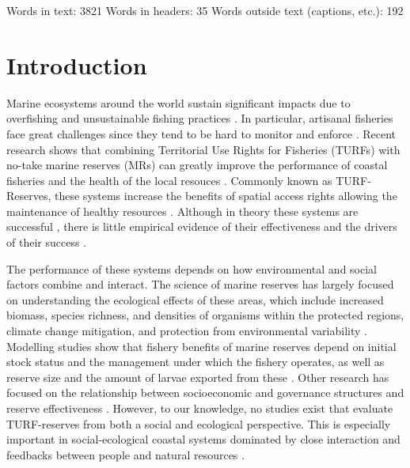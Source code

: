 \documentclass{frontiersSCNS}
\begin{document}
Words in text: 3821 \textbar{} Words in headers: 35 \textbar{} Words
outside text (captions, etc.): 192

\clearpage

\section{Introduction}\label{introduction}

Marine ecosystems around the world sustain significant impacts due to
overfishing and unsustainable fishing practices
\citep{halpern_2008-dK,worm_2006-IB,pauly_2005-qV}. In particular,
artisanal fisheries face great challenges since they tend to be hard to
monitor and enforce \citep{costello_2012}. Recent research shows that
combining Territorial Use Rights for Fisheries (TURFs) with no-take
marine reserves (MRs) can greatly improve the performance of coastal
fisheries and the health of the local resouces
\citep{costello_2010-Ix,lester_2017}. Commonly known as TURF-Reserves,
these systems increase the benefits of spatial access rights allowing
the maintenance of healthy resources
\citep{afflerbach_2014-HP,lester_2017}. Although in theory these systems
are successful \citep{costello_2010-Ix,smallhornwest_2018}, there is
little empirical evidence of their effectiveness and the drivers of
their success \citep{afflerbach_2014-HP,lester_2017}.

The performance of these systems depends on how environmental and social
factors combine and interact. The science of marine reserves has largely
focused on understanding the ecological effects of these areas, which
include increased biomass, species richness, and densities of organisms
within the protected regions, climate change mitigation, and protection
from environmental variability
\citep{lester_2009-Ks,giakoumi_2017-V2,sala_2017-69,roberts_2017-J9,micheli_2012-EU}.
Modelling studies show that fishery benefits of marine reserves depend
on initial stock status and the management under which the fishery
operates, as well as reserve size and the amount of larvae exported from
these \citep{hilborn_2006,krueck_2017-J1,deleo_2015}. Other research has
focused on the relationship between socioeconomic and governance
structures and reserve effectiveness
\citep{halpern_2013,lpezangarita_2014,mascia_2017-m_}. However, to our
knowledge, no studies exist that evaluate TURF-reserves from both a
social and ecological perspective. This is especially important in
social-ecological coastal systems dominated by close interaction and
feedbacks between people and natural resources \citep{ostrom_2009-hg}.
\end{document}
